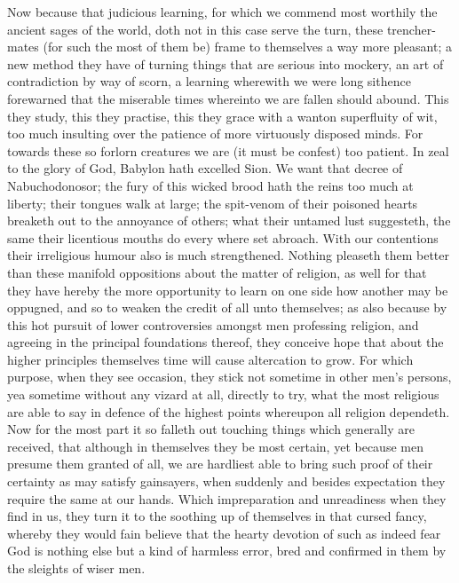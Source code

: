 Now because that judicious learning, for which we commend most worthily the ancient sages of the world, doth not in this case serve the turn, these trencher-mates (for such the most of them be) frame to themselves a way more pleasant; a new method they have of turning things that are serious into mockery, an art of contradiction by way of scorn, a learning wherewith we were long sithence forewarned that the miserable times whereinto we are fallen should abound. This they study, this they practise, this they grace with a wanton superfluity of wit, too much insulting over the patience of more virtuously disposed minds.
For towards these so forlorn creatures we are (it must be confest) too patient. In zeal to the glory of God, Babylon hath excelled Sion. We want that decree of Nabuchodonosor;  the fury of this wicked brood hath the reins too much at liberty; their tongues walk at large; the spit-venom of their poisoned hearts breaketh out to the annoyance of others; what their untamed lust suggesteth, the same their licentious mouths do every where set abroach.
With our contentions their irreligious humour also is much strengthened. Nothing pleaseth them better than these manifold oppositions about the matter of religion, as well for that they have hereby the more opportunity to learn on one side how another may be oppugned, and so to weaken the credit of all unto themselves; as also because by this hot pursuit of lower controversies amongst men professing religion, and agreeing in the principal foundations thereof, they conceive hope that about the higher principles themselves time will cause altercation to grow.
For which purpose, when they see occasion, they stick not sometime in other men’s persons, yea sometime without any vizard at all, directly to try, what the most religious are able to say in defence of the highest points whereupon all religion dependeth. Now for the most part it so falleth out touching things which generally are received, that although in themselves they be most certain, yet because men presume them granted of all, we are hardliest able to bring such proof of their certainty as may satisfy gainsayers, when suddenly and besides expectation they require the same at our hands. Which impreparation and unreadiness when they find in us, they turn it to the soothing up of themselves in that cursed fancy, whereby they would fain believe that the hearty devotion of such as indeed fear God is nothing else but a kind of harmless error, bred and confirmed in them by the sleights of wiser men.
